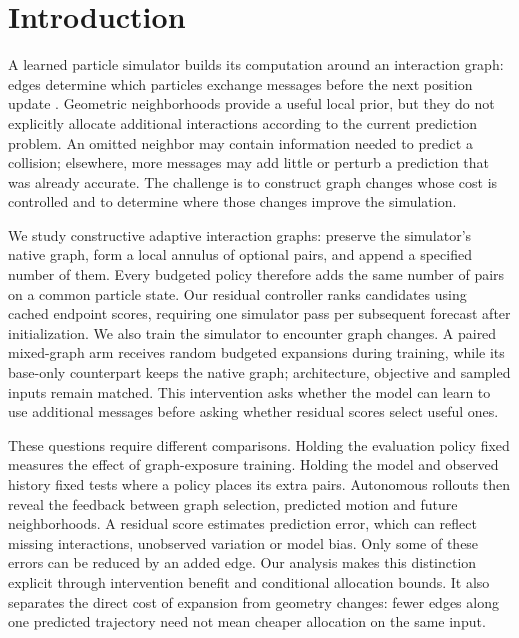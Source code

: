 \section{Introduction}
A learned particle simulator builds its computation around an interaction graph: edges determine which particles exchange messages before the next position update \citep{sanchez2020}. Geometric neighborhoods provide a useful local prior, but they do not explicitly allocate additional interactions according to the current prediction problem. An omitted neighbor may contain information needed to predict a collision; elsewhere, more messages may add little or perturb a prediction that was already accurate. The challenge is to construct graph changes whose cost is controlled and to determine where those changes improve the simulation.

We study constructive adaptive interaction graphs: preserve the simulator's native graph, form a local annulus of optional pairs, and append a specified number of them. Every budgeted policy therefore adds the same number of pairs on a common particle state. Our residual controller ranks candidates using cached endpoint scores, requiring one simulator pass per subsequent forecast after initialization. We also train the simulator to encounter graph changes. A paired mixed-graph arm receives random budgeted expansions during training, while its base-only counterpart keeps the native graph; architecture, objective and sampled inputs remain matched. This intervention asks whether the model can learn to use additional messages before asking whether residual scores select useful ones.

These questions require different comparisons. Holding the evaluation policy fixed measures the effect of graph-exposure training. Holding the model and observed history fixed tests where a policy places its extra pairs. Autonomous rollouts then reveal the feedback between graph selection, predicted motion and future neighborhoods. A residual score estimates prediction error, which can reflect missing interactions, unobserved variation or model bias. Only some of these errors can be reduced by an added edge. Our analysis makes this distinction explicit through intervention benefit and conditional allocation bounds. It also separates the direct cost of expansion from geometry changes: fewer edges along one predicted trajectory need not mean cheaper allocation on the same input.

